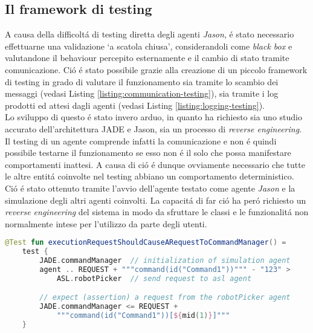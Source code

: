 \subsection{Il framework di testing}
A causa della difficolt\'a di testing diretta degli agenti \textit{Jason}, \'e stato necessario effettuarne una validazione `a scatola chiusa', considerandoli come \textit{black box} e valutandone il behaviour percepito esternamente e il cambio di stato tramite comunicazione. Ci\'o \'e stato possibile grazie alla creazione di un piccolo framework di testing in grado di valutare il funzionamento sia tramite lo scambio dei messaggi (vedasi Listing \ref{listing:communication-testing}), sia tramite i log prodotti ed attesi dagli agenti (vedasi Listing \ref{listing:logging-testing}).\\
Lo sviluppo di questo \'e stato invero arduo, in quanto ha richiesto sia uno studio accurato dell'architettura JADE e Jason, sia un processo di \textit{reverse engineering}. Il testing di un agente comprende infatti la comunicazione e non \'e quindi possibile testarne il funzionamento se esso non \'e il solo che possa manifestare comportamenti inattesi. A causa di ci\'o \'e dunque ovviamente necessario che tutte le altre entit\'a coinvolte nel testing abbiano un comportamento deterministico. Ci\'o \'e stato ottenuto tramite l'avvio dell'agente testato come agente \textit{Jason} e la simulazione degli altri agenti coinvolti. La capacit\'a di far ci\'o ha per\'o richiesto un \textit{reverse engineering} del sistema in modo da sfruttare le classi e le funzionalit\'a non normalmente intese per l'utilizzo da parte degli utenti.

\begin{lstlisting}[language=Kotlin, caption=Esempio di test `basato sulla comunicazione' permesso dall'utilizzo del framework, label=listing:communication-testing]
@Test fun executionRequestShouldCauseARequestToCommandManager() = 
    test {
        JADE.commandManager  // initialization of simulation agent
        agent .. REQUEST + """command(id("Command1"))""" - "123" >
            ASL.robotPicker  // send request to asl agent

        // expect (assertion) a request from the robotPicker agent
        JADE.commandManager <= REQUEST +
            """command(id("Command1"))[${mid(1)}]"""
    }
\end{lstlisting}

